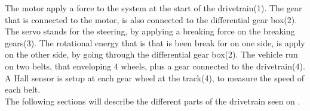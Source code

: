 The motor apply a force to the system at the start of the drivetrain(1). The gear that is connected to the motor, is also connected to the differential gear box(2). The servo stands for the steering, by applying a breaking force on the breaking gears(3). The rotational energy that is that is been break for on one side, is apply on the other side, by going through the differential gear box(2). The vehicle run on two belts, that enveloping 4 wheels, plus a gear connected to the drivetrain(4). A Hall sensor is setup at each gear wheel at the track(4), to measure the speed of each belt.\\
The following sections will describe the different parts of the drivetrain seen on .\\
